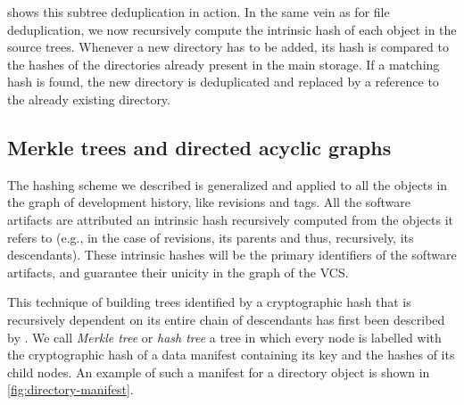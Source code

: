  shows this subtree deduplication in action. In
the same vein as for file deduplication, we now recursively compute the
intrinsic hash of each object in the source trees. Whenever a new directory has
to be added, its hash is compared to the hashes of the directories already
present in the main storage. If a matching hash is found, the new directory is
deduplicated and replaced by a reference to the already existing directory.

\subsection{Merkle trees and directed acyclic graphs}

The hashing scheme we described is generalized and applied to all the objects
in the graph of development history, like revisions and tags. All the software
artifacts are attributed an intrinsic hash recursively computed from the
objects it refers to (e.g., in the case of revisions, its parents and thus,
recursively, its descendants). These intrinsic hashes will be the primary
identifiers of the software artifacts, and guarantee their unicity in the graph
of the \gls{VCS}.

This technique of building trees identified by a cryptographic hash that is
recursively dependent on its entire chain of descendants has first been
described by \textcite{Merkle}. We call \emph{Merkle tree} or \emph{hash
tree} a tree in which every node is labelled with the cryptographic hash of a
data manifest containing its key and the hashes of its child nodes. An example
of such a manifest for a directory object is shown in
\cref{fig:directory-manifest}.

